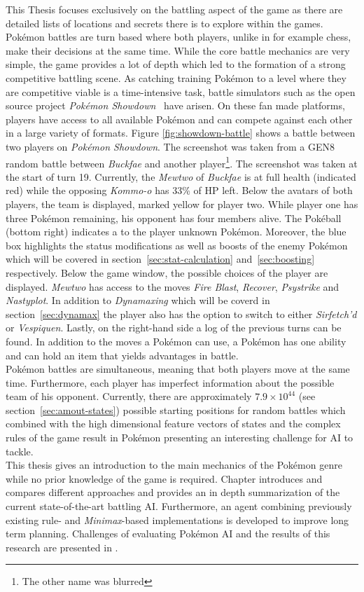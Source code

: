 This Thesis focuses exclusively on the battling aspect of the game as there are detailed lists of locations and
secrets there is to explore within the games. Pokémon battles are turn based where both players, unlike in 
for example chess, make their decisions at the same time. While the core battle mechanics are very simple, 
the game provides a lot of depth which led to the formation of a strong competitive battling scene.
As catching training Pokémon to a level where they are competitive viable is a time-intensive task, battle
simulators such as the open source project \textit{Pokémon Showdown}~\autocite{Showdown:Github} have arisen. On these fan made
platforms, players have access to all available Pokémon and can compete against each other in a large variety
of formats.
Figure \ref{fig:showdown-battle} shows a battle between two players on 
\textit{Pokémon Showdown}. The screenshot was taken from a \ac{GEN8} random battle between 
\textit{Buckfae} and another player\footnote{The other name was blurred}. The screenshot was taken
at the start of turn 19. Currently, the \textit{Mewtwo} of \textit{Buckfae} is at full health (indicated
red) while the opposing \textit{Kommo-o} has 33\% of \ac{HP} left. Below the avatars of both players,
the team is displayed, marked yellow for player two. While player one has three Pokémon remaining,
his opponent has four members alive. The Pokéball (bottom right) indicates a to the player unknown Pokémon.
Moreover, the blue box highlights the status modifications as well as boosts of the enemy Pokémon which will be
covered in section~\ref{sec:stat-calculation} and~\ref{sec:boosting} respectively.
Below the game window, the possible choices of the
player are displayed. \textit{Mewtwo} has access to the moves \textit{Fire Blast}, \textit{Recover}, \textit{Psystrike}
and \textit{Nastyplot}. In addition to \textit{Dynamaxing} which will be coverd in section~\ref{sec:dynamax} the player
also has the option to switch to either \textit{Sirfetch'd} or \textit{Vespiquen}. Lastly,
on the right-hand side a log of the previous turns can be found. In addition to the moves a Pokémon can use,
a Pokémon has one ability and can hold an item that yields advantages in battle. 
\\
Pokémon battles are simultaneous, meaning that both players move at the same time. Furthermore, each player has imperfect
information about the possible team of his opponent. 
Currently, there are approximately $7.9 \times 10^{44}$ 
(see section~\ref{sec:amout-states}) possible
starting positions for random battles which combined with the high dimensional feature vectors of states 
and the complex rules of the game result in Pokémon presenting an interesting challenge for AI to tackle. 
\\
This thesis gives an introduction to the main mechanics of the Pokémon genre while no prior knowledge of the 
game is required. 
Chapter  introduces and compares different approaches and provides an in depth summarization
of the current state-of-the-art battling AI. 
Furthermore, an agent combining previously existing rule- and 
\textit{Minimax}-based implementations is developed to improve long term planning.
Challenges of evaluating Pokémon AI and the results of this research
are presented in .